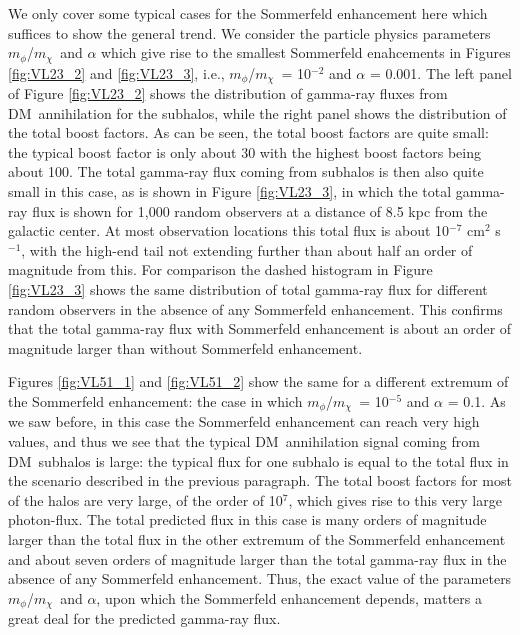 \documentclass[aps,prd,twocolumn,amsmath,amssymb,floatfix,nofootinbib,10pt]{revtex4}
\newcommand{\ie}{i.e.}
\newcommand{\DM}{DM}
\newcommand{\mdm}{\ensuremath{m_{\chi}}}
\newcommand{\mv}{\ensuremath{m_{\phi}}}
\begin{document}
We only cover some typical cases for the Sommerfeld enhancement here
which suffices to show the general trend. We consider the particle
physics parameters \mv/\mdm\ and $\alpha$ which give rise to the
smallest Sommerfeld enahcements in Figures \ref{fig:VL23_2} and
\ref{fig:VL23_3}, \ie, \mv/\mdm\ = 10$^{-2}$ and $\alpha$ = 0.001. The
left panel of Figure \ref{fig:VL23_2} shows the distribution of
gamma-ray fluxes from \DM\ annihilation for the subhalos, while the
right panel shows the distribution of the total boost factors. As can
be seen, the total boost factors are quite small: the typical boost
factor is only about 30 with the highest boost factors being about
100. The total gamma-ray flux coming from subhalos is then also quite
small in this case, as is shown in Figure \ref{fig:VL23_3}, in which
the total gamma-ray flux is shown for 1,000 random observers at a
distance of 8.5 kpc from the galactic center. At most observation
locations this total flux is about 10$^{-7}$ cm$^2$ s$^{-1}$, with the
high-end tail not extending further than about half an order of
magnitude from this. For comparison the dashed histogram in Figure
\ref{fig:VL23_3} shows the same distribution of total gamma-ray flux
for different random observers in the absence of any Sommerfeld
enhancement. This confirms that the total gamma-ray flux with
Sommerfeld enhancement is about an order of magnitude larger than
without Sommerfeld enhancement. 

Figures \ref{fig:VL51_1} and \ref{fig:VL51_2} show the same for a
different extremum of the Sommerfeld enhancement: the case in which
\mv/\mdm\ = 10$^{-5}$ and $\alpha$ = 0.1. As we saw before, in this
case the Sommerfeld enhancement can reach very high values, and thus
we see that the typical \DM\ annihilation signal coming from \DM\
subhalos is large: the typical flux for one subhalo is equal to the
total flux in the scenario described in the previous paragraph. The
total boost factors for most of the halos are very large, of the order
of 10$^7$, which gives rise to this very large photon-flux. The total
predicted flux in this case is many orders of magnitude larger than
the total flux in the other extremum of the Sommerfeld enhancement and
about seven orders of magnitude larger than the total gamma-ray flux
in the absence of any Sommerfeld enhancement. Thus, the exact value of
the parameters \mv/\mdm\ and $\alpha$, upon which the Sommerfeld
enhancement depends, matters a great deal for the predicted gamma-ray
flux.
\end{document}
